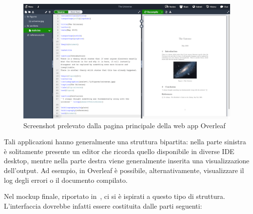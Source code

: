       \begin{figure}[htbp]
        \centering
        \includegraphics[width=.85\textwidth]{res/fig/overleaf.png}%
        \caption{Screenshot prelevato dalla pagina principale della web app Overleaf}%
        \label{fig:overleaf}
      \end{figure}

      Tali applicazioni hanno generalmente una struttura bipartita:
      nella parte sinistra è solitamente presente un editor che ricorda quello disponibile in diverse IDE desktop, mentre nella parte destra viene generalmente inserita una visualizzazione dell'output.
      Ad esempio, in Overleaf è possibile, alternativamente, visualizzare il log degli errori o il documento compilato.

      Nel mockup finale, riportato in~, ci si è ispirati a questo tipo di struttura.
      L'interfaccia dovrebbe infatti essere costituita dalle parti seguenti:

